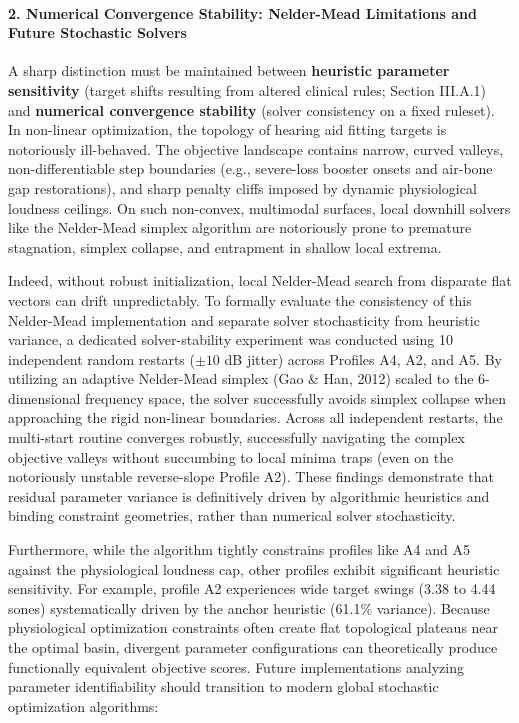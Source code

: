 \documentclass[
  12pt,
]{article}
\begin{document}
\paragraph{2. Numerical Convergence Stability: Nelder-Mead Limitations
and Future Stochastic
Solvers}\label{numerical-convergence-stability-nelder-mead-limitations-and-future-stochastic-solvers}

A sharp distinction must be maintained between \textbf{heuristic
parameter sensitivity} (target shifts resulting from altered clinical
rules; Section III.A.1) and \textbf{numerical convergence stability}
(solver consistency on a fixed ruleset). In non-linear optimization, the
topology of hearing aid fitting targets is notoriously ill-behaved. The
objective landscape contains narrow, curved valleys, non-differentiable
step boundaries (e.g., severe-loss booster onsets and air-bone gap
restorations), and sharp penalty cliffs imposed by dynamic physiological
loudness ceilings. On such non-convex, multimodal surfaces, local
downhill solvers like the Nelder-Mead simplex algorithm are notoriously
prone to premature stagnation, simplex collapse, and entrapment in
shallow local extrema.

Indeed, without robust initialization, local Nelder-Mead search from
disparate flat vectors can drift unpredictably. To formally evaluate the
consistency of this Nelder-Mead implementation and separate solver
stochasticity from heuristic variance, a dedicated solver-stability
experiment was conducted using 10 independent random restarts
(\(\pm 10\) dB jitter) across Profiles A4, A2, and A5. By utilizing an
adaptive Nelder-Mead simplex (Gao \& Han, 2012) scaled to the
6-dimensional frequency space, the solver successfully avoids simplex
collapse when approaching the rigid non-linear boundaries. Across all
independent restarts, the multi-start routine converges robustly,
successfully navigating the complex objective valleys without succumbing
to local minima traps (even on the notoriously unstable reverse-slope
Profile A2). These findings demonstrate that residual parameter variance
is definitively driven by algorithmic heuristics and binding constraint
geometries, rather than numerical solver stochasticity.

Furthermore, while the algorithm tightly constrains profiles like A4 and
A5 against the physiological loudness cap, other profiles exhibit
significant heuristic sensitivity. For example, profile A2 experiences
wide target swings (3.38 to 4.44 sones) systematically driven by the
anchor heuristic (61.1\% variance). Because physiological optimization
constraints often create flat topological plateaus near the optimal
basin, divergent parameter configurations can theoretically produce
functionally equivalent objective scores. Future implementations
analyzing parameter identifiability should transition to modern global
stochastic optimization algorithms:
\end{document}
